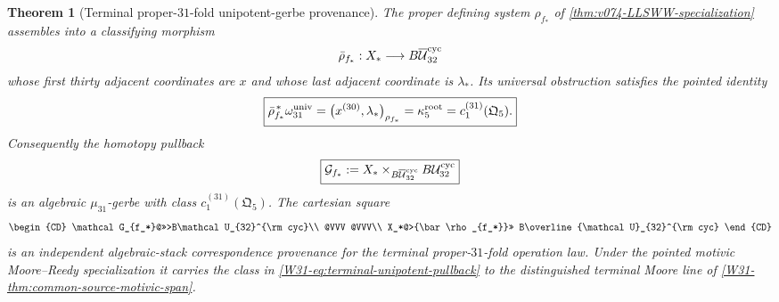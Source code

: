 \documentclass[11pt]{article}
\newtheorem{theorem}{Theorem}[section]
\theoremstyle{remark}
\begin{document}
\begin{theorem}[Terminal proper-\(31\)-fold unipotent-gerbe provenance]
\label{W31-thm:terminal-unipotent-gerbe-provenance}
The proper defining system \(\rho_{f_*}\) of
\cref{thm:v074-LLSWW-specialization} assembles into a classifying morphism
\[
 \bar\rho_{f_*}:
 X_*\longrightarrow B\overline{\mathcal U}_{32}^{\rm cyc}
\]
whose first thirty adjacent coordinates are \(x\) and whose last adjacent
coordinate is \(\lambda_*\).  Its universal obstruction satisfies the pointed
identity
\begin{equation}\label{W31-eq:terminal-unipotent-pullback}
 \boxed{
 \bar\rho_{f_*}^{\,*}\omega_{31}^{\rm univ}
 =
 \bigl(x^{(30)},\lambda_*\bigr)_{\rho_{f_*}}
 =\kappa_5^{\rm root}
 =c_1^{(31)}(\mathfrak Q_5).}
\end{equation}
Consequently the homotopy pullback
\begin{equation}\label{W31-eq:terminal-obstruction-gerbe}
 \boxed{
 \mathcal G_{f_*}
 :=X_*\times_{B\overline{\mathcal U}_{32}^{\rm cyc}}
       B\mathcal U_{32}^{\rm cyc}}
\end{equation}
is an algebraic \(\mu_{31}\)-gerbe with class
\(c_1^{(31)}(\mathfrak Q_5)\).  The cartesian square
\[
\begin{CD}
 \mathcal G_{f_*}@>>>B\mathcal U_{32}^{\rm cyc}\\
 @VVV @VVV\\
 X_*@>{\bar\rho_{f_*}}>>
 B\overline{\mathcal U}_{32}^{\rm cyc}
\end{CD}
\]
is an independent algebraic-stack correspondence provenance for the terminal
proper-\(31\)-fold operation law.  Under the pointed motivic Moore--Reedy
specialization it carries the class in
\eqref{W31-eq:terminal-unipotent-pullback} to the distinguished terminal Moore
line of \cref{W31-thm:common-source-motivic-span}.
\end{theorem}
\end{document}

